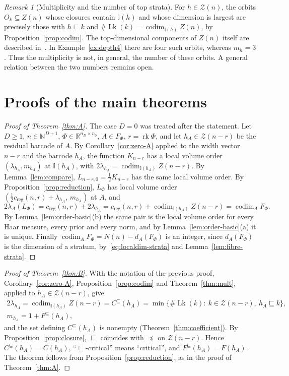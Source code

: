 \documentclass[11pt,a4paper]{article}
\theoremstyle{definition}
\theoremstyle{remark}
\newtheorem{remark}[theorem]{Remark}
\numberwithin{equation}{section}
\newcommand{\N}{\mathbb{N}}
\newcommand{\R}{\mathbb{R}}
\newcommand{\rk}{\operatorname{rk}}
\newcommand{\codim}{\operatorname{codim}}
\newcommand{\creg}{c_{\mathrm{reg}}}
\newcommand{\Zb}{\mathcal Z}
\newcommand{\I}{\mathbb I}
\newcommand{\Lk}{\operatorname{Lk}}
\begin{document}
\begin{remark}[Multiplicity and the number of top strata]\label{rem:components}
For $h\in\Zb(n)$, the orbits $O_k\subseteq Z(n)$ whose closures contain $\I(h)$ and whose dimension is largest are precisely those with $h\sqsubseteq k$ and $\#\Lk(k)=\codim_{\I(h)}Z(n)$, by Proposition~\ref{prop:codim}. The top-dimensional components of $Z(n)$ itself are described in~\cite{lehalleur-rimanyi,koncki-rimanyi}. In Example~\ref{ex:depth4} there are four such orbits, whereas $m_h=3$. Thus the multiplicity is not, in general, the number of these orbits. A general relation between the two numbers remains open.
\end{remark}
\section{Proofs of the main theorems}\label{sec:proofs}

\begin{proof}[Proof of Theorem~\ref{thm:A}]
The case $D=0$ was treated after the statement. Let $D\ge1$, $n\in\N^{D+1}$, $\Phi\in\R^{n_D\times n_0}$, $A\in F_\Phi$, $r=\rk\Phi$, and let $h_A\in\Zb(n-r)$ be the residual barcode of $A$. By Corollary~\ref{cor:zero-A} applied to the width vector $n-r$ and the barcode $h_A$, the function $K_{n-r}$ has a local volume order $(\lambda_{h_A},m_{h_A})$ at $\I(h_A)$, with $2\lambda_{h_A}=\codim_{\I(h_A)}Z(n-r)$. By Lemma~\ref{lem:compare}, $L_{n-r,0}=\frac12K_{n-r}$ has the same local volume order. By Proposition~\ref{prop:reduction}, $L_\Phi$ has local volume order $(\frac12\creg(n,r)+\lambda_{h_A},\,m_{h_A})$ at $A$, and
\[
2\lambda_A(L_\Phi)=\creg(n,r)+2\lambda_{h_A}=\creg(n,r)+\codim_{\I(h_A)}Z(n-r)=\codim_AF_\Phi .
\]
By Lemma~\ref{lem:order-basic}(b) the same pair is the local volume order for every Haar measure, every prior and every norm, and by Lemma~\ref{lem:order-basic}(a) it is unique. Finally $\codim_AF_\Phi=N(n)-d_A(F_\Phi)$ is an integer, since $d_A(F_\Phi)$ is the dimension of a stratum, by~\eqref{eq:localdim-strata} and Lemma~\ref{lem:fibre-strata}.
\end{proof}

\begin{proof}[Proof of Theorem~\ref{thm:B}]
With the notation of the previous proof, Corollary~\ref{cor:zero-A}, Proposition~\ref{prop:codim} and Theorem~\ref{thm:mult}, applied to $h_A\in\Zb(n-r)$, give
\begin{gather*}
2\lambda_{h_A}=\codim_{\I(h_A)}Z(n-r)=C^\sqsubseteq(h_A)=\min\{\#\Lk(k):\ k\in\Zb(n-r),\ h_A\sqsubseteq k\},\\
m_{h_A}=1+F^\sqsubseteq(h_A),
\end{gather*}
and the set defining $C^\sqsubseteq(h_A)$ is nonempty (Theorem~\ref{thm:coefficient}). By Proposition~\ref{prop:closure}, $\sqsubseteq$ coincides with $\preceq$ on $\Zb(n-r)$. Hence $C^\sqsubseteq(h_A)=C(h_A)$, ``$\sqsubseteq$-critical'' means ``critical'', and $F^\sqsubseteq(h_A)=F(h_A)$. The theorem follows from Proposition~\ref{prop:reduction}, as in the proof of Theorem~\ref{thm:A}.
\end{proof}
\end{document}
